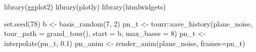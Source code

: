 \documentclass[
  letterpaper,
]{book}
\newenvironment{Shaded}{\begin{snugshade}}{\end{snugshade}}
\newcommand{\AttributeTok}[1]{\textcolor[rgb]{0.40,0.45,0.13}{#1}}
\newcommand{\DecValTok}[1]{\textcolor[rgb]{0.68,0.00,0.00}{#1}}
\newcommand{\FloatTok}[1]{\textcolor[rgb]{0.68,0.00,0.00}{#1}}
\newcommand{\FunctionTok}[1]{\textcolor[rgb]{0.28,0.35,0.67}{#1}}
\newcommand{\NormalTok}[1]{\textcolor[rgb]{0.00,0.23,0.31}{#1}}
\newcommand{\OtherTok}[1]{\textcolor[rgb]{0.00,0.23,0.31}{#1}}
\newcommand{\SpecialCharTok}[1]{\textcolor[rgb]{0.37,0.37,0.37}{#1}}
\begin{document}
\begin{Shaded}
\begin{Highlighting}[]
\FunctionTok{library}\NormalTok{(ggplot2)}
\FunctionTok{library}\NormalTok{(plotly)}
\FunctionTok{library}\NormalTok{(htmlwidgets)}

\FunctionTok{set.seed}\NormalTok{(}\DecValTok{78}\NormalTok{)}
\NormalTok{b }\OtherTok{\textless{}{-}} \FunctionTok{basis\_random}\NormalTok{(}\DecValTok{7}\NormalTok{, }\DecValTok{2}\NormalTok{)}
\NormalTok{pn\_t }\OtherTok{\textless{}{-}}\NormalTok{ tourr}\SpecialCharTok{::}\FunctionTok{save\_history}\NormalTok{(plane\_noise, }
                    \AttributeTok{tour\_path =} \FunctionTok{grand\_tour}\NormalTok{(),}
                    \AttributeTok{start =}\NormalTok{ b,}
                    \AttributeTok{max\_bases =} \DecValTok{8}\NormalTok{)}
\NormalTok{pn\_t }\OtherTok{\textless{}{-}} \FunctionTok{interpolate}\NormalTok{(pn\_t, }\FloatTok{0.1}\NormalTok{)}
\NormalTok{pn\_anim }\OtherTok{\textless{}{-}} \FunctionTok{render\_anim}\NormalTok{(plane\_noise,}
                         \AttributeTok{frames=}\NormalTok{pn\_t)}


\end{Highlighting}
\end{Shaded}
\end{document}

